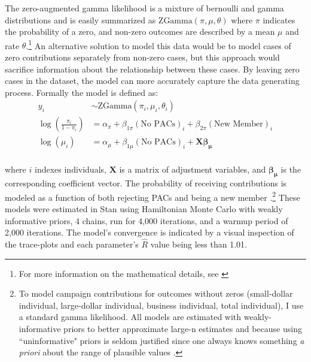 \documentclass[12pt]{article}
\begin{document}
\begin{appendices}
The zero-augmented gamma likelihood is a mixture of bernoulli and gamma distributions and is easily summarized as $\text{ZGamma}(\pi, \mu, \theta)$ where $\pi$ indicates the probability of a zero, and non-zero outcomes are described by a mean $\mu$ and rate $\theta$.\footnote{For more information on the mathematical details, see \citet{mccullagn1989}} An alternative solution to model this data would be to model cases of zero contributions separately from non-zero cases, but this approach would sacrifice information about the relationship between these cases. By leaving zero cases in the dataset, the model can more accurately capture the data generating process. Formally the model is defined as:
$$
\begin{aligned}
    y_i &\sim \text{ZGamma}(\pi_i, \mu_i, \theta_i) \\
    \log \left( \frac{\pi_i}{1 - \pi_i} \right) &= \alpha_{\pi} + \beta_{1\pi} (\text{No PACs})_i + \beta_{2\pi} (\text{New Member})_i \\
    \log(\mu_i) &= \alpha_{\mu} + \beta_{1\mu} (\text{No PACs})_i + \bm{X} \bm{\beta_{\mu}} \\
\end{aligned}
$$

\noindent where $i$ indexes individuals, $\bm{X}$ is a matrix of adjustment variables, and $\bm{\beta_{\mu}}$ is the corresponding coefficient vector. The probability of receiving contributions is modeled as a function of both rejecting PACs and being a new member  \citep{brunell2005, biersack1993}.\footnote{To model campaign contributions for outcomes without zeros (small-dollar individual, large-dollar individual, business individual, total individual), I use a standard gamma likelihood. All models are estimated with weakly-informative priors to better approximate large-n estimates \citep{mcneish2016} and because using ``uninformative" priors is seldom justified since one always knows something \textit{a priori} about the range of plausible values \citep{gelman2008a}.} These models were estimated in Stan using Hamiltonian Monte Carlo with weakly informative priors, 4 chains, run for 4,000 iterations, and a warmup period of 2,000 iterations. The model's convergence is indicated by a visual inspection of the trace-plots and each parameter's $\hat{R}$ value being less than 1.01. 


\end{appendices}
\end{document}
